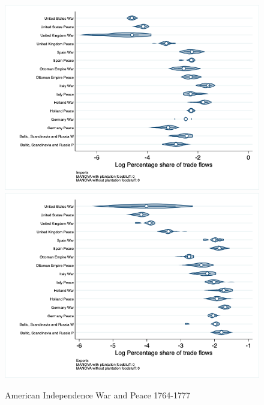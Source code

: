 \documentclass[12pt,a4paper,notitlepage,english]{article}
\begin{document}
\begin{figure}
\centering
\caption{American Independence War and Peace 1764-1777}
\label{peace1764_1777_indep_nat_distr_pays7}
\includegraphics[scale=.4]{peace1764_1777_indep_nat_distr_Ipays7}
\includegraphics[scale=.4]{peace1764_1777_indep_nat_distr_Xpays7}
\end{figure}
\end{document}
